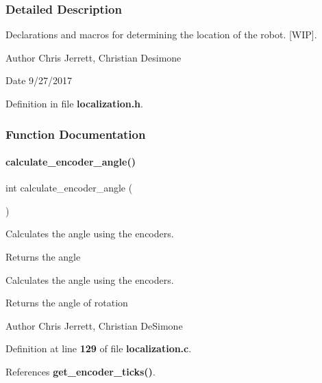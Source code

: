 \subsubsection{Detailed Description}
Declarations and macros for determining the location of the robot. [W\+IP]. 

\begin{DoxyAuthor}{Author}
Chris Jerrett, Christian Desimone 
\end{DoxyAuthor}
\begin{DoxyDate}{Date}
9/27/2017 
\end{DoxyDate}


Definition in file \textbf{ localization.\+h}.



\subsubsection{Function Documentation}
\mbox{\label{localization_8h_a5dd17937f5561711cd12cdefa8d31869}} 
\paragraph{calculate\+\_\+encoder\+\_\+angle()}
{\footnotesize\ttfamily int calculate\+\_\+encoder\+\_\+angle (\begin{DoxyParamCaption}{ }\end{DoxyParamCaption})}



Calculates the angle using the encoders. 

\begin{DoxyReturn}{Returns}
the angle
\end{DoxyReturn}
Calculates the angle using the encoders.

\begin{DoxyReturn}{Returns}
the angle of rotation 
\end{DoxyReturn}
\begin{DoxyAuthor}{Author}
Chris Jerrett, Christian De\+Simone 
\end{DoxyAuthor}


Definition at line \textbf{ 129} of file \textbf{ localization.\+c}.



References \textbf{ get\+\_\+encoder\+\_\+ticks()}.



